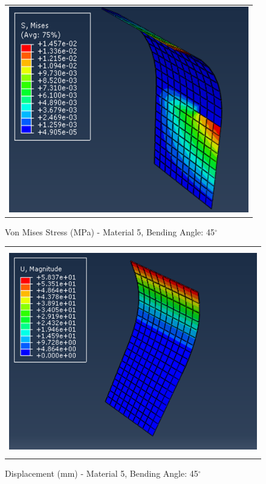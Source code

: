 \documentclass[a4paper,12pt]{article}
\numberwithin{equation}{section}
\numberwithin{figure}{section}
\begin{document}
\begin{figure}[H]
  \centering
  \begin{tabular}{@{}c@{}}
    \includegraphics[width=0.7\linewidth,height=255pt]{Results/Bending/M5_VMS_45.png} \\
  \end{tabular}
  \caption{Von Mises Stress (MPa) - Material 5,  Bending Angle: 45$^{\circ}$ }
\end{figure}

\begin{figure}[H]
  \centering
  \begin{tabular}{@{}c@{}}
    \includegraphics[width=0.7\linewidth,height=255pt]{Results/Bending/M5_DIS_45.png} \\
  \end{tabular}
  \caption{Displacement (mm) - Material 5, Bending Angle: 45$^{\circ}$ }
\end{figure}
\end{document}
